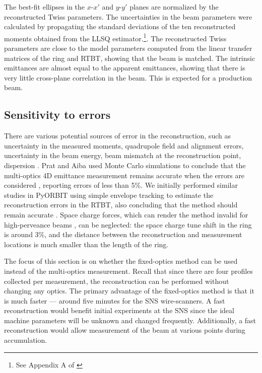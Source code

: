 %
The best-fit ellipses in the $x$-$x'$ and $y$-$y'$ planes are normalized by the reconstructed Twiss parameters. The uncertainties in the beam parameters were calculated by propagating the standard deviations of the ten reconstructed moments obtained from the LLSQ estimator.\footnote{See Appendix A of \cite{Faus-Golfe2016}}. The reconstructed Twiss parameters are close to the model parameters computed from the linear transfer matrices of the ring and RTBT, showing that the beam is matched. The intrinsic emittances are almost equal to the apparent emittances, showing that there is very little cross-plane correlation in the beam. This is expected for a production beam.



\subsection{Sensitivity to errors}

There are various potential sources of error in the reconstruction, such as uncertainty in the measured moments, quadrupole field and alignment errors, uncertainty in the beam energy, beam mismatch at the reconstruction point, dispersion \cite{Mostacci2012}. Prat and Aiba used Monte Carlo simulations to conclude that the multi-optics 4D emittance measurement remains accurate when the errors are considered \cite{Prat2014}, reporting errors of less than 5\%. We initially performed similar studies in PyORBIT using simple envelope tracking to estimate the reconstruction errors in the RTBT, also concluding that the method should remain accurate \cite{Hoover2021-IPAC}. Space charge forces, which can render the method invalid for high-perveance beams \cite{Anderson2002}, can be neglected: the space charge tune shift in the ring is around 3\%, and the distance between the reconstruction and measurement locations is much smaller than the length of the ring. 

The focus of this section is on whether the fixed-optics method can be used instead of the multi-optics measurement. Recall that since there are four profiles collected per measurement, the reconstruction can be performed without changing any optics. The primary advantage of the fixed-optics method is that it is much faster — around five minutes for the SNS wire-scanners. A fast reconstruction would benefit initial experiments at the SNS since the ideal machine parameters will be unknown and changed frequently. Additionally, a fast reconstruction would allow measurement of the beam at various points during accumulation. 

